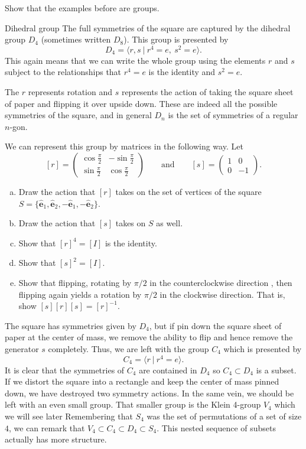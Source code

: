 \documentclass{article}
\theoremstyle{indented}
\newcommand{\evec}{\boldsymbol{\hat{e}}}
\begin{document}
\begin{problem}{}{}
Show that the examples before are groups.
\end{problem}

\begin{problem}{Dihedral group}{}
The full symmetries of the square are captured by the dihedral group $D_4$ (sometimes written $D_{8}$). This group is presented by
\[
D_4 = \langle r,s ~\vert~ r^4=e, ~s^2=e \rangle.
\]
This again means that we can write the whole group using the elements $r$ and $s$ subject to the relationships that $r^4=e$ is the identity and $s^2=e$.

The $r$ represents rotation and $s$ represents the action of taking the square sheet of paper and flipping it over upside down. These are indeed all the possible symmetries of the square, and in general $D_{n}$ is the set of symmetries of a regular $n$-gon.

We can represent this group by matrices in the following way. Let
\[
[r] = \begin{pmatrix} \cos \frac{\pi}{2} & - \sin\frac{\pi}{2} \\ \sin \frac{\pi}{2} & \cos \frac{\pi}{2} \end{pmatrix} \qquad \textrm{and} \qquad [s] = \begin{pmatrix} 1 & 0 \\ 0 & -1 \end{pmatrix}.
\]
\begin{enumerate}[(a)]
    \item Draw the action that $[r]$ takes on the set of vertices of the square $S=\{\evec_1,\evec_2, -\evec_1, - \evec_2\}$.
    \item Draw the action that $[s]$ takes on $S$ as well.
    \item Show that $[r]^4 = [I]$ is the identity.
    \item Show that $[s]^2 = [I]$.
    \item Show that flipping, rotating by $\pi/2$ in the counterclockwise direction , then flipping again yields a rotation by $\pi/2$ in the clockwise direction. That is, show $[s][r][s]=[r]^{-1}$.
\end{enumerate}
\end{problem}

The square has symmetries given by $D_4$, but if pin down the square sheet of paper at the center of mass, we remove the ability to flip and hence remove the generator $s$ completely. Thus, we are left with the group $C_4$ which is presented by
\[
C_4 = \langle r ~\vert~ r^4=e \rangle.
\]
It is clear that the symmetries of $C_4$ are contained in $D_4$ so $C_4 \subset D_4$ is a subset. If we distort the square into a rectangle and keep the center of mass pinned down, we have destroyed two symmetry actions. In the same vein, we should be left with an even small group. That smaller group is the Klein 4-group $V_4$ which we will see later Remembering that $S_4$ was the set of permutations of a set of size $4$, we can remark that $V_4 \subset C_4 \subset D_4 \subset S_4$. This nested sequence of subsets actually has more structure.
\end{document}
